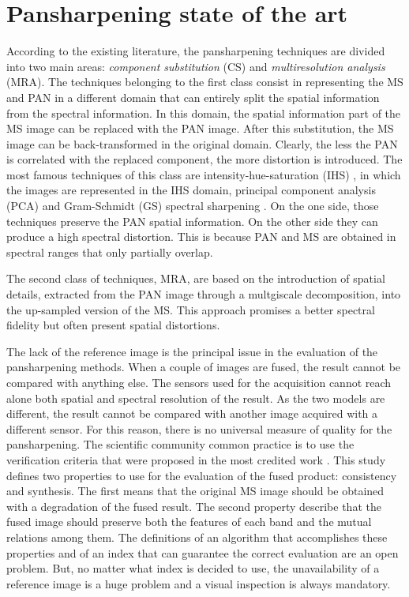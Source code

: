 \documentclass[12pt]{report}
\begin{document}
\chapter{Pansharpening state of the art}


According to the existing literature, the pansharpening techniques are divided into two main areas: \textit{component substitution} (CS) and \textit{multiresolution analysis} (MRA). The techniques belonging to the first class consist in representing the MS and PAN in a different domain that can entirely split the spatial information from the spectral information. In this domain, the spatial information part of the MS image can be replaced with the PAN image. After this substitution, the MS image can be back-transformed in the original domain. Clearly, the less the PAN is correlated with the replaced component, the more distortion is introduced. The most famous techniques of this class are intensity-hue-saturation (IHS) \cite{ihs1, ihs2}, in which the images are represented in the IHS domain, principal component analysis (PCA) \cite{scaleinvariance1, pca2} and Gram-Schmidt (GS) spectral sharpening \cite{gs}. On the one side, those techniques preserve the PAN spatial information. On the other side they can produce a high spectral distortion. This is because PAN and MS are obtained in spectral ranges that only partially overlap. 

The second class of techniques, MRA, are based on the introduction of spatial details, extracted from the PAN image through a multgiscale decomposition, into the up-sampled version of the MS. This approach promises a better spectral fidelity but often present spatial distortions.

The lack of the reference image is the principal issue in the evaluation of the pansharpening methods.
When a couple of images are fused, the result cannot be compared with anything else. The sensors used for the acquisition cannot reach alone both spatial and spectral resolution of the result. As the two models are different, the result cannot be compared with another image acquired with a different sensor.
For this reason, there is no universal measure of quality for the pansharpening. The scientific community common practice is to use the verification criteria that were proposed in the most credited work \cite{towaldetal}. This study defines two properties to use for the evaluation of the fused product: consistency and synthesis. The first means that the original MS image should be obtained with a degradation of the fused result.
The second property describe that the fused image should preserve both the features of each band and the mutual relations among them. The definitions of an algorithm that accomplishes these properties and of an index that can guarantee the correct evaluation are an open problem. But, no matter what index is decided to use, the unavailability of a reference image is a huge problem and a visual inspection is always mandatory. 
\end{document}
